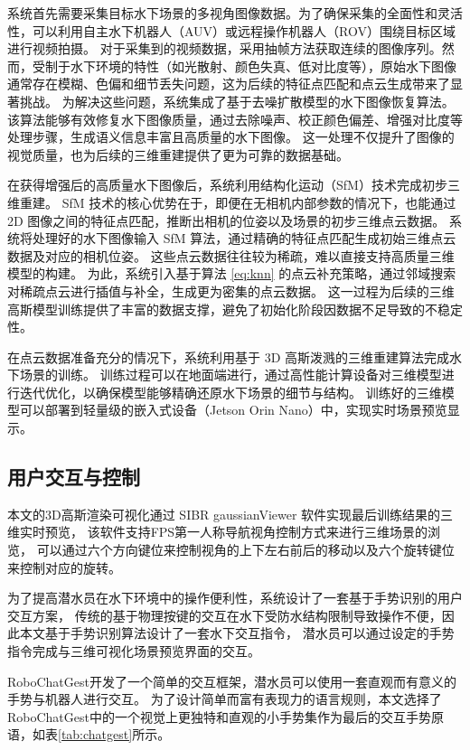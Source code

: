 系统首先需要采集目标水下场景的多视角图像数据。为了确保采集的全面性和灵活性，可以利用自主水下机器人（AUV）或远程操作机器人（ROV）围绕目标区域进行视频拍摄。
对于采集到的视频数据，采用抽帧方法获取连续的图像序列。然而，受制于水下环境的特性（如光散射、颜色失真、低对比度等），原始水下图像通常存在模糊、色偏和细节丢失问题，这为后续的特征点匹配和点云生成带来了显著挑战。
为解决这些问题，系统集成了基于去噪扩散模型的水下图像恢复算法。该算法能够有效修复水下图像质量，通过去除噪声、校正颜色偏差、增强对比度等处理步骤，生成语义信息丰富且高质量的水下图像。
这一处理不仅提升了图像的视觉质量，也为后续的三维重建提供了更为可靠的数据基础。

在获得增强后的高质量水下图像后，系统利用结构化运动（SfM）技术完成初步三维重建。
SfM 技术的核心优势在于，即便在无相机内部参数的情况下，也能通过 2D 图像之间的特征点匹配，推断出相机的位姿以及场景的初步三维点云数据。
系统将处理好的水下图像输入 SfM 算法，通过精确的特征点匹配生成初始三维点云数据及对应的相机位姿。
这些点云数据往往较为稀疏，难以直接支持高质量三维模型的构建。
为此，系统引入基于算法 \ref{eq:knn} 的点云补充策略，通过邻域搜索对稀疏点云进行插值与补全，生成更为密集的点云数据。
这一过程为后续的三维高斯模型训练提供了丰富的数据支撑，避免了初始化阶段因数据不足导致的不稳定性。

在点云数据准备充分的情况下，系统利用基于 3D 高斯泼溅的三维重建算法完成水下场景的训练。
训练过程可以在地面端进行，通过高性能计算设备对三维模型进行迭代优化，以确保模型能够精确还原水下场景的细节与结构。
训练好的三维模型可以部署到轻量级的嵌入式设备（Jetson Orin Nano）中，实现实时场景预览显示。

\subsection{用户交互与控制}
本文的3D高斯渲染可视化通过 SIBR gaussianViewer 软件实现最后训练结果的三维实时预览，
该软件支持FPS第一人称导航视角控制方式来进行三维场景的浏览，
可以通过六个方向键位来控制视角的上下左右前后的移动以及六个旋转键位来控制对应的旋转。

为了提高潜水员在水下环境中的操作便利性，系统设计了一套基于手势识别的用户交互方案，
传统的基于物理按键的交互在水下受防水结构限制导致操作不便，因此本文基于手势识别算法设计了一套水下交互指令，
潜水员可以通过设定的手势指令完成与三维可视化场景预览界面的交互。

RoboChatGest\cite{robochatgest}开发了一个简单的交互框架，潜水员可以使用一套直观而有意义的手势与机器人进行交互。
为了设计简单而富有表现力的语言规则，本文选择了RoboChatGest中的一个视觉上更独特和直观的小手势集作为最后的交互手势原语，如表\ref{tab:chatgest}所示。


